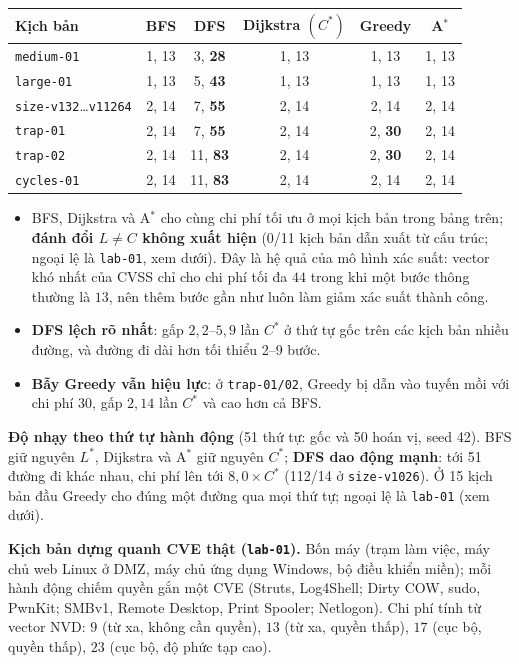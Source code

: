 \documentclass[11pt,a4paper]{article}
\newcommand{\Cs}{C^{*}}
\newcommand{\Ls}{L^{*}}
\begin{document}
\begin{center}\small
\begin{tabular}{@{}lccccc@{}}
\toprule
Kịch bản & BFS & DFS & Dijkstra $(\Cs)$ & Greedy & A$^{*}$ \\
\midrule
\texttt{medium-01}   & 1, 13 & 3, \textbf{28} & 1, 13 & 1, 13 & 1, 13 \\
\texttt{large-01}    & 1, 13 & 5, \textbf{43} & 1, 13 & 1, 13 & 1, 13 \\
\texttt{size-v132}\ldots\texttt{v11264} & 2, 14 & 7, \textbf{55} & 2, 14 & 2, 14 & 2, 14 \\
\texttt{trap-01}     & 2, 14 & 7, \textbf{55} & 2, 14 & 2, \textbf{30} & 2, 14 \\
\texttt{trap-02}     & 2, 14 & 11, \textbf{83} & 2, 14 & 2, \textbf{30} & 2, 14 \\
\texttt{cycles-01}   & 2, 14 & 11, \textbf{83} & 2, 14 & 2, 14 & 2, 14 \\
\bottomrule
\end{tabular}
\end{center}

\begin{itemize}
  \item BFS, Dijkstra và A$^{*}$ cho cùng chi phí tối ưu ở mọi kịch bản trong bảng trên; \textbf{đánh đổi $L\neq C$ không xuất hiện} (0/11 kịch bản dẫn xuất từ cấu trúc; ngoại lệ là \texttt{lab-01}, xem dưới). Đây là hệ quả của mô hình xác suất: vector khó nhất của CVSS chỉ cho chi phí tối đa $44$ trong khi một bước thông thường là $13$, nên thêm bước gần như luôn làm giảm xác suất thành công.
  \item \textbf{DFS lệch rõ nhất}: gấp $2{,}2$--$5{,}9$ lần $\Cs$ ở thứ tự gốc trên các kịch bản nhiều đường, và đường đi dài hơn tối thiểu 2--9 bước.
  \item \textbf{Bẫy Greedy vẫn hiệu lực}: ở \texttt{trap-01/02}, Greedy bị dẫn vào tuyến mồi với chi phí $30$, gấp $2{,}14$ lần $\Cs$ và cao hơn cả BFS.
\end{itemize}

\textbf{Độ nhạy theo thứ tự hành động} (51 thứ tự: gốc và 50 hoán vị, seed 42). BFS giữ nguyên $\Ls$, Dijkstra và A$^{*}$ giữ nguyên $\Cs$; \textbf{DFS dao động mạnh}: tới 51 đường đi khác nhau, chi phí lên tới $8{,}0\times\Cs$ (112/14 ở \texttt{size-v1026}). Ở 15 kịch bản đầu Greedy cho đúng một đường qua mọi thứ tự; ngoại lệ là \texttt{lab-01} (xem dưới).

\textbf{Kịch bản dựng quanh CVE thật (\texttt{lab-01}).} Bốn máy (trạm làm việc, máy chủ web Linux ở DMZ, máy chủ ứng dụng Windows, bộ điều khiển miền); mỗi hành động chiếm quyền gắn một CVE (Struts, Log4Shell; Dirty COW, sudo, PwnKit; SMBv1, Remote Desktop, Print Spooler; Netlogon). Chi phí tính từ vector NVD: $9$ (từ xa, không cần quyền), $13$ (từ xa, quyền thấp), $17$ (cục bộ, quyền thấp), $23$ (cục bộ, độ phức tạp cao).
\end{document}
